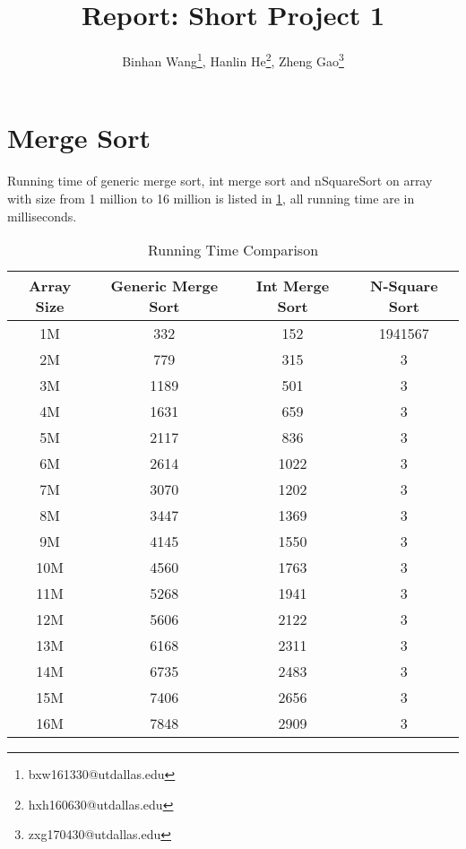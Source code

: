 \documentclass[10pt]{article}
\title{\vspace*{-1em}Report: Short Project 1}
\author{Binhan Wang\footnote{bxw161330@utdallas.edu}, Hanlin He\footnote{hxh160630@utdallas.edu},
Zheng Gao\footnote{zxg170430@utdallas.edu}}
\begin{document}
\maketitle

\section{Merge Sort}

Running time of generic merge sort, int merge sort and nSquareSort on array
with size from 1 million to 16 million is listed in \cref{r1}, all running time
are in milliseconds.

\begin{table}[H]
    \centering
    \caption{Running Time Comparison}\label{r1}
    \begin{tabular}{c|ccc}
        Array Size & Generic Merge Sort & Int Merge Sort & N-Square Sort \\\hline\hline
        1M & 332 & 152 & 1941567 \\
        2M & 779 & 315 & 3 \\
        3M & 1189 & 501 & 3 \\
        4M & 1631 & 659 & 3 \\
        5M & 2117 & 836 & 3 \\
        6M & 2614 & 1022 & 3 \\
        7M & 3070 & 1202 & 3 \\
        8M & 3447 & 1369 & 3 \\
        9M & 4145 & 1550 & 3 \\
        10M & 4560 & 1763 & 3 \\
        11M & 5268 & 1941 & 3 \\
        12M & 5606 & 2122 & 3 \\
        13M & 6168 & 2311 & 3 \\
        14M & 6735 & 2483 & 3 \\
        15M & 7406 & 2656 & 3 \\
        16M & 7848 & 2909 & 3 \\
    \end{tabular}
\end{table}
\end{document}
